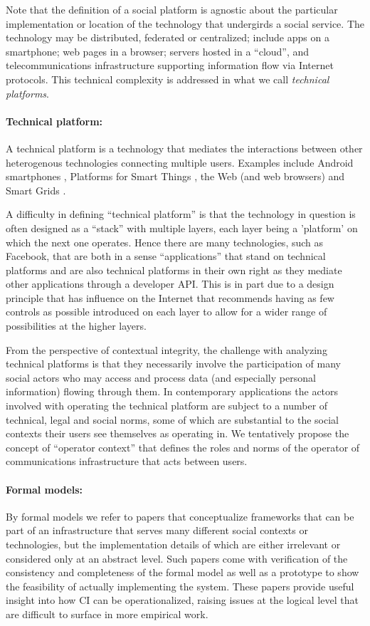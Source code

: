 \documentclass[../thesis.tex]{subfiles}
\begin{document}
Note that the definition of a social platform is agnostic about the
particular implementation or location of the technology that undergirds
a social service. The technology may be distributed, federated or
centralized; include apps on a smartphone; web pages in a browser;
servers hosted in a ``cloud'', and
telecommunications infrastructure supporting information flow via
Internet protocols. This technical complexity is addressed in what we
call \textit{technical platforms}.


\paragraph{Technical platform:}
A technical platform is a technology that
mediates the interactions between other heterogenous technologies
connecting multiple users. Examples include Android smartphones
\cite{wijesekera2015android},
Platforms for Smart Things \cite{jia2017contexiot},
the Web (and web browsers)
and Smart Grids \cite{salehie2012adaptive}.

A difficulty in defining ``technical
platform'' is that the technology in question is often
designed as a ``stack'' with multiple
layers, each layer being a 'platform'
on which the next one operates.
Hence there are many technologies, such
as Facebook, that are both in a sense
``applications'' that stand on technical
platforms and are also technical platforms in their
own right as they
mediate other applications through a developer API.
This is in part due
to a design principle that has influence on the
Internet \cite{clark2002tussle} that recommends having as few controls as possible
introduced on
each layer to allow for a wider range of possibilities at
the higher
layers.

From the perspective of contextual integrity, the challenge with
analyzing technical platforms is that they necessarily involve the
participation of many social actors who may access and process data
(and especially personal information) flowing through them. In
contemporary applications the actors involved with operating the
technical platform are subject to a number of technical, legal and
social norms, some of which are substantial to the social contexts
their users see themselves as operating in. We tentatively propose the
concept of ``operator context'' that defines
the roles and norms of the operator of communications infrastructure
that acts between users. 

\paragraph{Formal models:} By formal models we refer to papers that
conceptualize frameworks that can be part of an infrastructure that
serves many different social contexts or technologies, but the
implementation details of which are either irrelevant or considered
only at an abstract level. Such papers come with verification of the
consistency and completeness of the formal model as well as a prototype
to show the feasibility of actually implementing the system. These
papers provide useful insight into how CI can be operationalized,
raising issues at the logical level that are difficult to surface in
more empirical work.
\end{document}
